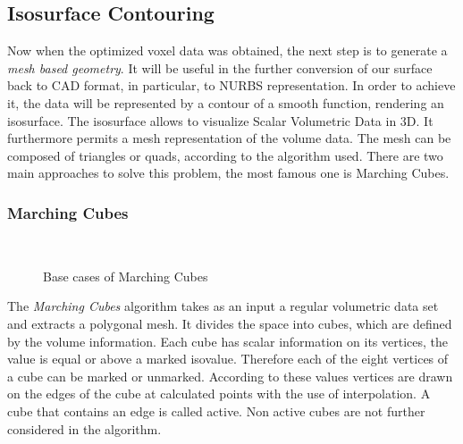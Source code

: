 \subsection{Isosurface Contouring}
Now when the optimized voxel data was obtained, the next step is to generate a \emph{mesh based
geometry}. It will be useful in the further conversion of our surface back to CAD format, in particular, to NURBS representation. In order to achieve it, the
data will be represented by a contour of a smooth function, rendering an isosurface. The
isosurface allows to visualize Scalar Volumetric Data in 3D. It furthermore permits a mesh
representation of the volume data. The mesh can be composed of triangles or quads, according
to the algorithm used. There are two main approaches to solve this problem, the most
famous one is Marching Cubes.



\subsubsection{Marching Cubes} 
\begin{figure}
\centering
   \\
   \caption{Base cases of Marching Cubes}
   \label{fig:MC_basecase}
\end{figure}
The \emph{Marching Cubes} algorithm takes as an input a regular volumetric data set and extracts a polygonal mesh. It
divides the space into cubes, which are defined by the volume information. Each cube has scalar
information on its vertices, the value is equal or above a marked isovalue. Therefore each of the
eight vertices of a cube can be marked or unmarked. According to these values vertices are drawn
on the edges of the cube at calculated points with the use of interpolation. A cube that contains
an edge is called active. Non active cubes are not further considered in the algorithm.

